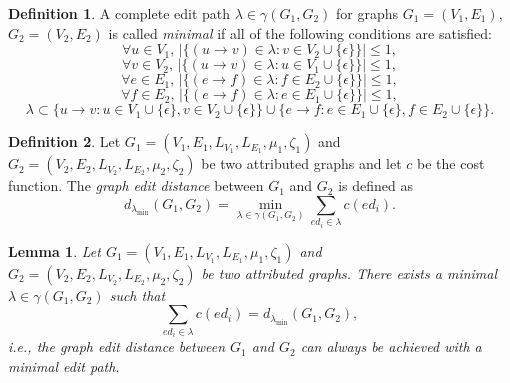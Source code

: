 \documentclass{article}
\newtheorem{lemma}{Lemma}
\theoremstyle{definition}
\newtheorem{definition}{Definition}
\begin{document}
\begin{definition}
  \label{def:minimal}
  A complete edit path $\lambda \in \gamma(G_1, G_2)$ for graphs $G_1 = (V_1, E_1)$, $G_2 = (V_2, E_2)$ is called \emph{minimal} if all of the following conditions are satisfied:
  \begin{equation}
  \forall u \in V_1\text{, }|\{ (u \to v) \in \lambda: v \in V_2 \cup \{ \epsilon \} \}| \le 1, \tag{M1} \label{eq:minimal1}
  \end{equation}
  \begin{equation}
  \forall v \in V_2\text{, }|\{ (u \to v) \in \lambda: u \in V_1 \cup \{ \epsilon \} \}| \le 1, \tag{M2} \label{eq:minimal2}
  \end{equation}
  \begin{equation}
  \forall e \in E_1\text{, }|\{ (e \to f) \in \lambda: f \in E_2 \cup \{ \epsilon \} \}| \le 1, \tag{M3} \label{eq:minimal3}
  \end{equation}
  \begin{equation}
  \forall f \in E_2\text{, }|\{ (e \to f) \in \lambda: e \in E_1 \cup \{ \epsilon \} \}| \le 1, \tag{M4} \label{eq:minimal4}
  \end{equation}
  \begin{equation} \tag{M5} \label{eq:minimal5}
  \lambda \subset \{ u \to v: u \in V_1 \cup \{ \epsilon \}, v \in V_2 \cup \{ \epsilon \} \} \cup \{ e \to f: e \in E_1 \cup \{ \epsilon \}, f \in E_2 \cup \{ \epsilon \} \}.
  \end{equation}
\end{definition}
\begin{definition}
  Let $G_1 = (V_1, E_1, L_{V_1}, L_{E_1}, \mu_1, \zeta_1)$ and $G_2 = (V_2, E_2, L_{V_2}, L_{E_2}, \mu_2, \zeta_2)$ be two attributed graphs and let $c$ be the cost function. The \emph{graph edit distance} between $G_1$ and $G_2$ is defined as
  \[ d_{\lambda_{\text{min}}}(G_1, G_2) = \min_{\lambda \in \gamma(G_1, G_2)} \sum_{ed_i \in \lambda} c(ed_i).\]
\end{definition}
\begin{lemma}
  Let $G_1 = (V_1, E_1, L_{V_1}, L_{E_1}, \mu_1, \zeta_1)$ and $G_2 = (V_2, E_2, L_{V_2}, L_{E_2}, \mu_2, \zeta_2)$ be two attributed graphs. There exists a minimal $\lambda \in \gamma(G_1, G_2)$ such that
  \begin{equation}
    \label{eq:distance}
    \tag{$\dagger$}
    \sum_{ed_i \in \lambda} c(ed_i) = d_{\lambda_{\text{min}}}(G_1, G_2),
  \end{equation}
  i.e., the graph edit distance between $G_1$ and $G_2$ can always be achieved with a minimal edit path.
\end{lemma}
\end{document}
